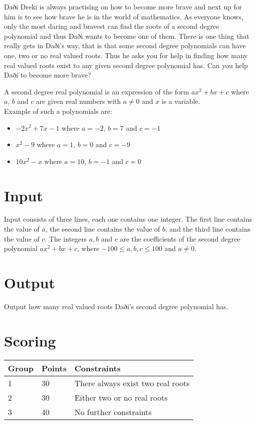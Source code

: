 
Daði Dreki is always practising on how to become more brave and next up for him is to see how brave he is in the world of mathematics.
As everyone knows, only the most daring and bravest can find the roots of a second degree polynomial and thus Daði wants to become one of them.
There is one thing that really gets in Daði's way, that is that some second degree polynomials can have one, two or no real valued roots.
Thus he asks you for help in finding how many real valued roots exist to any given second degree polynomial has.
Can you help Daði to become more brave?

A second degree real polynomial is an expression of the form $ax^2 + bx + c$ where $a$, $b$ and $c$ are given real numbers with $a \neq 0$ and $x$ is a variable. \\
Example of such a polynomials are:
\begin{itemize}
	\item $-2x^2 + 7x - 1$ where $a = -2$, $b = 7$ and $c = -1$
	\item $x^2 - 9$ where $a = 1$, $b = 0$ and $c = - 9$ 
	\item $10x^2 - x$ where $a = 10$, $b = -1$ and $c = 0$
\end{itemize}

\section*{Input}
Input consists of three lines, each one contains one integer.
The first line contains the value of $a$, the second line contains the value of $b$, and the third line contains the value of $c$.
The integers $a, b$ and $c$ are the coefficients of the second degree polynomial $ax^2 + bx + c$, where $-100 \leq a, b, c \leq 100$ and $a \neq 0$.

\section*{Output}
Output how many real valued roots Daði's second degree polynomial has.

\section*{Scoring}
\begin{tabular}{|l|l|l|}
\hline
Group & Points & Constraints \\ \hline
1     & 30   & There always exist two real roots \\ \hline
2     & 30   & Either two or no real roots \\ \hline
3     & 40   & No further constraints \\ \hline
\end{tabular}

